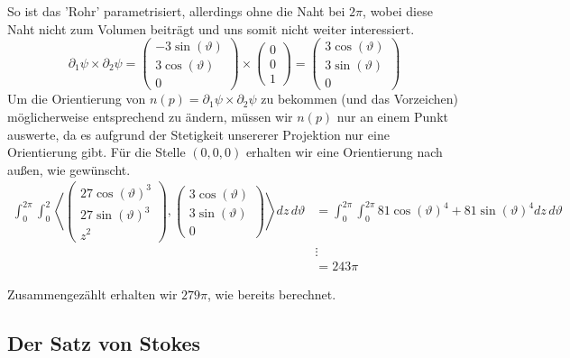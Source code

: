 \documentclass[main.tex]{subfiles}
\begin{document}
\begin{Beispiel}[$B = \{(x,y,z) \in \R^3 \mid x^2 + y^2 \leq 9 \land 0 \leq z \leq 2\}$ (ein Zylinder)]
\begin{itemize}
      So ist das 'Rohr' parametrisiert, allerdings ohne die Naht bei $2\pi$, wobei diese Naht nicht zum Volumen beiträgt und uns somit nicht weiter interessiert.
      $$\partial_1 \psi \times \partial_2 \psi = \begin{pmatrix}
      -3 \sin(\vartheta) \\ 3 \cos(\vartheta) \\ 0
      \end{pmatrix} \times \begin{pmatrix}
        0 \\ 0 \\ 1
      \end{pmatrix} = \begin{pmatrix}
          3 \cos(\vartheta) \\ 3 \sin(\vartheta) \\ 0
      \end{pmatrix}$$
      Um die Orientierung von $n(p) = \partial_1 \psi \times \partial_2 \psi$ zu bekommen (und das Vorzeichen) möglicherweise entsprechend zu ändern, müssen wir $n(p)$ nur an einem Punkt auswerte, da es aufgrund der Stetigkeit unsererer Projektion nur eine Orientierung gibt. Für die Stelle $(0,0,0)$ erhalten wir eine Orientierung nach außen, wie gewünscht.
      $$\begin{aligned}
        \int_0^{2 \pi} \int_0^{2} \left< \begin{pmatrix}
          27 \cos(\vartheta)^3 \\ 27 \sin(\vartheta)^3 \\ z^2
        \end{pmatrix}, \begin{pmatrix}
          3 \cos(\vartheta) \\ 3 \sin(\vartheta) \\ 0
        \end{pmatrix} \right> dz \, d\vartheta & = \int_0^{2 \pi} \int_0^{2\pi} 81 \cos(\vartheta)^4 + 81 \sin(\vartheta)^4 dz \, d\vartheta \\
        & \vdots \\
        & = 243 \pi
      \end{aligned}$$
  \end{itemize}
  Zusammengezählt erhalten wir $279 \pi$, wie bereits berechnet.
\end{Beispiel}

\subsection{Der Satz von Stokes}
\end{document}
